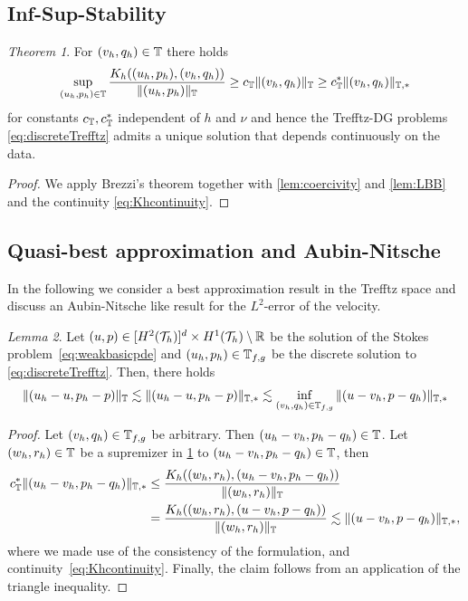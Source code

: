 \documentclass[pdflatex,sn-mathphys,Numbered]{sn-jnl}%
\theoremstyle{remark}%
\newtheorem{theorem}{Theorem}%
\newtheorem{lemma}[theorem]{Lemma}
\theoremstyle{definition}%
\begin{document}
\subsection{Inf-Sup-Stability}
\begin{theorem} \label{th:Khinfsup}
  For $(v_h,q_h) \in \mathbb{T}$ there holds
  \begin{equation}
    \sup_{(u_h,p_h) \in \mathbb{T}} \frac{K_h((u_h,p_h),(v_h,q_h))}{\Vert (u_h,p_h) \Vert_{\mathbb{T}} } \geq c_{\mathbb{T}} \Vert (v_h,q_h) \Vert_{\mathbb{T}} \geq c_{\mathbb{T}}^\ast \Vert (v_h,q_h) \Vert_{\mathbb{T},\ast}
  \end{equation}
  for constants $c_{\mathbb{T}}, c_{\mathbb{T}}^\ast$ independent of $h$ and $\nu$ and hence the Trefftz-DG problems \eqref{eq:discreteTrefftz} admits a unique solution that depends continuously on the data. 
\end{theorem}
\begin{proof}
 We apply Brezzi's theorem together with \cref{lem:coercivity} and \cref{lem:LBB} and the continuity \eqref{eq:Khcontinuity}.
\end{proof}

\subsection{Quasi-best approximation and Aubin-Nitsche}
In the following we consider a best approximation result in the Trefftz space and discuss
an Aubin-Nitsche like result for the $L^2$-error of the velocity.

\begin{lemma}
  Let $(u,p) \in [H^{2}({\mathcal{T}_h})]^d \times H^{1}({\mathcal{T}_h}) \setminus \mathbb{R}$ be
  the solution of the Stokes problem~\eqref{eq:weakbasicpde} and
  $(u_h,p_h) \in \mathbb{T}_{f,g}$ be the discrete solution to
  \eqref{eq:discreteTrefftz}. Then, there holds
  \begin{equation}
    \Vert (u_h-u,p_h-p) \Vert_{\mathbb{T}} \lesssim \Vert (u_h-u,p_h-p) \Vert_{\mathbb{T},\ast} \lesssim \inf_{(v_h,q_h) \in \mathbb{T}_{f,g}} \Vert (u-v_h,p-q_h) \Vert_{\mathbb{T},\ast}
  \end{equation}
\end{lemma}
\begin{proof} Let $(v_h,q_h) \in \mathbb{T}_{f,g}$ be arbitrary. Then $(u_h-v_h,p_h-q_h) \in \mathbb{T}$. 
  Let $(w_h,r_h) \in \mathbb{T}$ be a supremizer in \cref{th:Khinfsup} to $(u_h-v_h,p_h-q_h) \in \mathbb{T}$, then
  \begin{align*}
    c_{\mathbb{T}}^\ast  \Vert (u_h-v_h,p_h-q_h) \Vert_{\mathbb{T},\ast} & \leq \frac{K_h((w_h,r_h),(u_h-v_h,p_h-q_h))}{\Vert (w_h,r_h) \Vert_{\mathbb{T}} } \\ & = \frac{K_h((w_h,r_h),(u-v_h,p-q_h))}{\Vert (w_h,r_h) \Vert_{\mathbb{T}} }
    \lesssim \Vert (u-v_h,p-q_h) \Vert_{\mathbb{T},\ast},
  \end{align*}
  where we made use of the consistency of the formulation, and continuity~\eqref{eq:Khcontinuity}. Finally, the claim follows from an application of the triangle inequality.
\end{proof}
\end{document}
